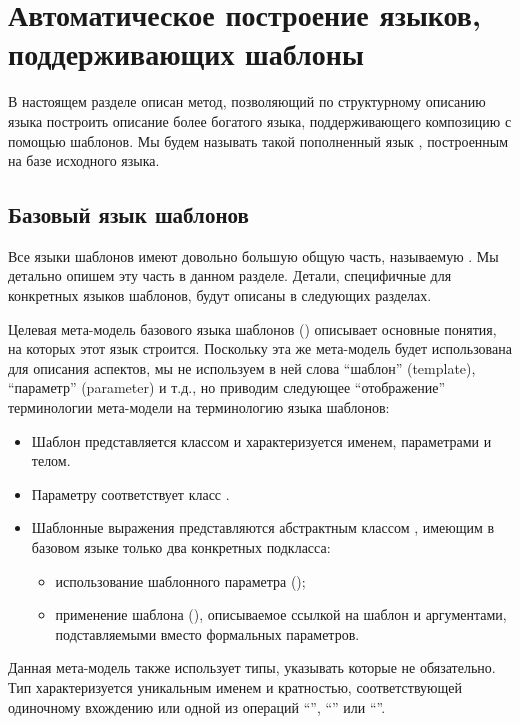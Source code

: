\chapter{Автоматическое построение языков, поддерживающих шаблоны}

В настоящем разделе описан метод, позволяющий по структурному описанию языка построить описание более богатого языка, поддерживающего композицию с помощью шаблонов. Мы будем называть такой пополненный язык , построенным на базе исходного языка.

\section{Базовый язык шаблонов}
Все языки шаблонов имеют довольно большую общую часть, называемую . Мы детально опишем эту часть в данном разделе. Детали, специфичные для конкретных языков шаблонов, будут описаны в следующих разделах.

Целевая мета-модель базового языка шаблонов () описывает основные понятия, на которых этот язык строится. Поскольку эта же мета-модель будет использована для описания аспектов, мы не используем в ней слова ``шаблон'' (template), ``параметр'' (parameter) и т.д., но приводим следующее ``отображение'' терминологии мета-модели на терминологию языка шаблонов:
\begin{itemize}
\item Шаблон представляется классом  и характеризуется именем, параметрами и телом.
\item Параметру соответствует класс .
\item Шаблонные выражения представляются абстрактным классом , имеющим в базовом языке только два конкретных подкласса:
	\begin{itemize}
	\item использование шаблонного параметра ();
	\item применение шаблона (), описываемое ссылкой на шаблон и аргументами, подставляемыми вместо формальных параметров.
	\end{itemize}
\end{itemize}
Данная мета-модель также использует типы, указывать которые не обязательно. Тип характеризуется уникальным именем и кратностью, соответствующей одиночному вхождению или одной из операций ``'', ``\code{*}'' или ``\code{+}''.

